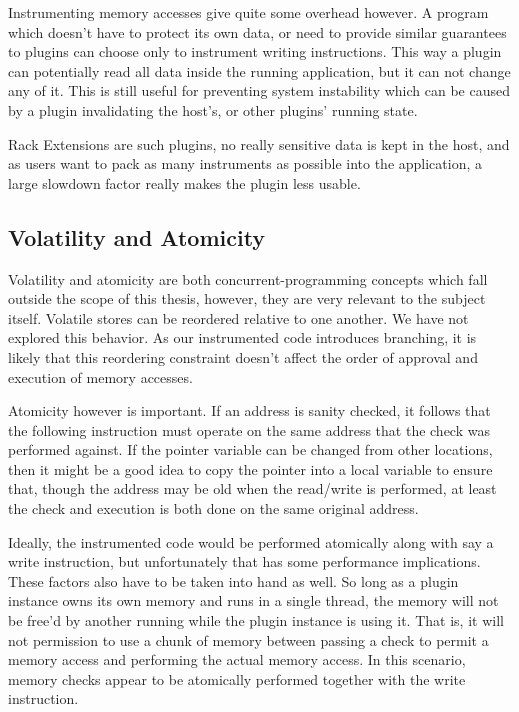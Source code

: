 Instrumenting memory accesses give quite some overhead however. A program which
doesn't have to protect its own data, or need to provide similar guarantees to
plugins can choose only to instrument writing instructions. This way a plugin
can potentially read all data inside the running application, but it can not
change any of it. This is still useful for preventing system instability which
can be caused by a plugin invalidating the host's, or other plugins' running
state.

Rack Extensions are such plugins, no really sensitive data is kept in the host,
and as users want to pack as many instruments as possible into the application,
a large slowdown factor really makes the plugin less usable.

\subsection {Volatility and Atomicity}

Volatility and atomicity are both concurrent-programming concepts which fall
outside the scope of this thesis, however, they are very relevant to the
subject itself. Volatile stores can be reordered relative to one another. We
have not explored this behavior. As our instrumented code introduces branching,
it is likely that this reordering constraint doesn't affect the order of
approval and execution of memory accesses.

Atomicity however is important. If an address is sanity checked, it follows that
the following instruction must operate on the same address that the check was
performed against. If the pointer variable can be changed from other locations,
then it might be a good idea to copy the pointer into a local variable to ensure
that, though the address may be old when the read/write is performed, at least
the check and execution is both done on the same original address.

Ideally, the instrumented code would be performed atomically along with say a
write instruction, but unfortunately that has some performance implications.
These factors also have to be taken into hand as well. So long as a plugin
instance owns its own memory and runs in a single thread, the memory will not be
free'd by another running while the plugin instance is using it. That is, it
will not permission to use a chunk of memory between passing a check to permit a
memory access and performing the actual memory access. In this scenario, memory
checks appear to be atomically performed together with the write instruction.

